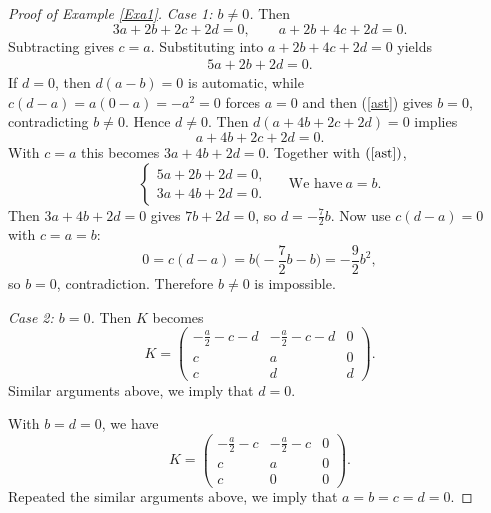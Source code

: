 \documentclass[12pt,a4paper]{amsart}
\theoremstyle{plain}
\newtheorem{corollary}[theorem]{Corollary}
\theoremstyle{remark}
\theoremstyle{definition}
\begin{document}
\begin{proof}[Proof of Example \ref{Exa1}]
	\smallskip
	\noindent\emph{Case 1: $b\neq 0$.}
	Then
	\[
	3a+2b+2c+2d=0,\qquad a+2b+4c+2d=0.
	\]
	Subtracting gives $c=a$. Substituting into $a+2b+4c+2d=0$ yields
	\begin{align}
		5a+2b+2d=0. \label{ast} %
	\end{align}
	If $d=0$, then $d(a-b)=0$ is automatic, while $c(d-a)=a(0-a)=-a^2=0$ forces $a=0$ and then (\ref{ast}) gives $b=0$, contradicting $b\neq 0$.
	Hence $d\neq 0$. Then $d(a+4b+2c+2d)=0$ implies
	\[
	a+4b+2c+2d=0.
	\]
	With $c=a$ this becomes $3a+4b+2d=0$. Together with $(\ref{ast})$,
	\[
	\begin{cases}
		5a+2b+2d=0,\\
		3a+4b+2d=0.
	\end{cases}
	\quad
	\textrm{ We have}\
	 a=b.
	\]
	Then $3a+4b+2d=0$ gives $7b+2d=0$, so $d=-\frac{7}{2}b$.
	Now use $c(d-a)=0$ with $c=a=b$:
	\[
	0=c(d-a)=b\Big(-\frac{7}{2}b-b\Big)=-\frac{9}{2}b^2,
	\]
	so $b=0$, contradiction. Therefore $b\neq 0$ is impossible.
	
	\smallskip
	\noindent\emph{Case 2: $b=0$.}
	Then $K$ becomes
	\[
	K=
	\begin{pmatrix}
		-\frac a2-c-d & -\frac a2-c-d & 0\\
		c & a & 0\\
		c & d & d
	\end{pmatrix}.
	\]
	Similar arguments above, we imply that $d=0$.
	
	With $b=d=0$, we have
	\[
	K=
	\begin{pmatrix}
		-\frac a2-c & -\frac a2-c & 0\\
		c & a & 0\\
		c & 0 & 0
	\end{pmatrix}.
	\]
	Repeated the similar arguments above, we imply that $a=b=c=d=0.$


	

\end{proof}
\end{document}
